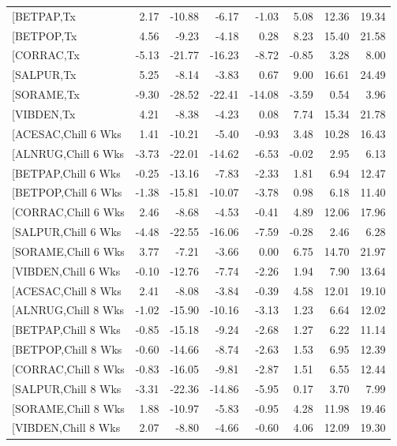 \documentclass{article}\usepackage[]{graphicx}\usepackage[]{color}
\begin{document}
\begin{longtable}{lrrrrrrr}
  [BETPAP,Tx & 2.17 & -10.88 & -6.17 & -1.03 & 5.08 & 12.36 & 19.34 \\ 
  [BETPOP,Tx & 4.56 & -9.23 & -4.18 & 0.28 & 8.23 & 15.40 & 21.58 \\ 
  [CORRAC,Tx & -5.13 & -21.77 & -16.23 & -8.72 & -0.85 & 3.28 & 8.00 \\ 
  [SALPUR,Tx & 5.25 & -8.14 & -3.83 & 0.67 & 9.00 & 16.61 & 24.49 \\ 
  [SORAME,Tx & -9.30 & -28.52 & -22.41 & -14.08 & -3.59 & 0.54 & 3.96 \\ 
  [VIBDEN,Tx & 4.21 & -8.38 & -4.23 & 0.08 & 7.74 & 15.34 & 21.78 \\ 
  [ACESAC,Chill 6 Wks & 1.41 & -10.21 & -5.40 & -0.93 & 3.48 & 10.28 & 16.43 \\ 
  [ALNRUG,Chill 6 Wks & -3.73 & -22.01 & -14.62 & -6.53 & -0.02 & 2.95 & 6.13 \\ 
  [BETPAP,Chill 6 Wks & -0.25 & -13.16 & -7.83 & -2.33 & 1.81 & 6.94 & 12.47 \\ 
  [BETPOP,Chill 6 Wks & -1.38 & -15.81 & -10.07 & -3.78 & 0.98 & 6.18 & 11.40 \\ 
  [CORRAC,Chill 6 Wks & 2.46 & -8.68 & -4.53 & -0.41 & 4.89 & 12.06 & 17.96 \\ 
  [SALPUR,Chill 6 Wks & -4.48 & -22.55 & -16.06 & -7.59 & -0.28 & 2.46 & 6.28 \\ 
  [SORAME,Chill 6 Wks & 3.77 & -7.21 & -3.66 & 0.00 & 6.75 & 14.70 & 21.97 \\ 
  [VIBDEN,Chill 6 Wks & -0.10 & -12.76 & -7.74 & -2.26 & 1.94 & 7.90 & 13.64 \\ 
  [ACESAC,Chill 8 Wks & 2.41 & -8.08 & -3.84 & -0.39 & 4.58 & 12.01 & 19.10 \\ 
  [ALNRUG,Chill 8 Wks & -1.02 & -15.90 & -10.16 & -3.13 & 1.23 & 6.64 & 12.02 \\ 
  [BETPAP,Chill 8 Wks & -0.85 & -15.18 & -9.24 & -2.68 & 1.27 & 6.22 & 11.14 \\ 
  [BETPOP,Chill 8 Wks & -0.60 & -14.66 & -8.74 & -2.63 & 1.53 & 6.95 & 12.39 \\ 
  [CORRAC,Chill 8 Wks & -0.83 & -16.05 & -9.81 & -2.87 & 1.51 & 6.55 & 12.44 \\ 
  [SALPUR,Chill 8 Wks & -3.31 & -22.36 & -14.86 & -5.95 & 0.17 & 3.70 & 7.99 \\ 
  [SORAME,Chill 8 Wks & 1.88 & -10.97 & -5.83 & -0.95 & 4.28 & 11.98 & 19.46 \\ 
  [VIBDEN,Chill 8 Wks & 2.07 & -8.80 & -4.66 & -0.60 & 4.06 & 12.09 & 19.30 \\ 

\end{longtable}
\end{document}
